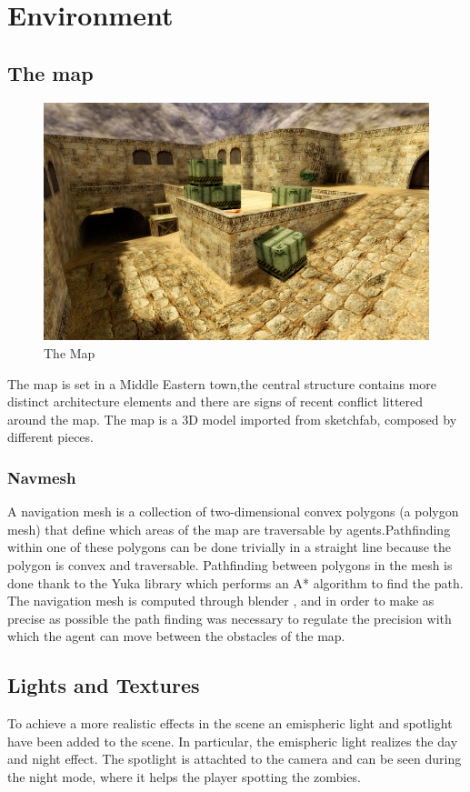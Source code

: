 \documentclass[12pt,a4paper,oneside]{article}
\theoremstyle{definition}
\begin{document}
\section{Environment}

\subsection{The map}
\begin{figure}[H]
    \includegraphics[width=.6\textwidth,center]{figures/dust_2.jpg}
    \caption{The Map}
\end{figure}
The map is set in a Middle Eastern town,the central structure contains more distinct architecture elements and  there are signs of recent conflict littered around the map. The map is a 3D model imported from sketchfab, composed by different pieces.


\subsubsection{Navmesh}
A navigation mesh is a collection of two-dimensional convex polygons (a polygon mesh) that define which areas of the map are traversable by agents.Pathfinding within one of these polygons can be done trivially in a straight line because the polygon is convex and traversable. Pathfinding between polygons in the mesh is done thank to the Yuka library which performs an A* algorithm to find the path. The navigation mesh is computed through blender , and in order to make as precise as possible the path finding was necessary to regulate the precision with which the agent can move between the obstacles of the map.

\subsection{Lights and Textures}

To achieve a more realistic effects in the scene an emispheric light and spotlight have been added to the scene. In particular, the emispheric light realizes the day and night effect. The spotlight is attachted to the camera and can be seen during the night mode, where it helps the player spotting the zombies. 
\end{document}
